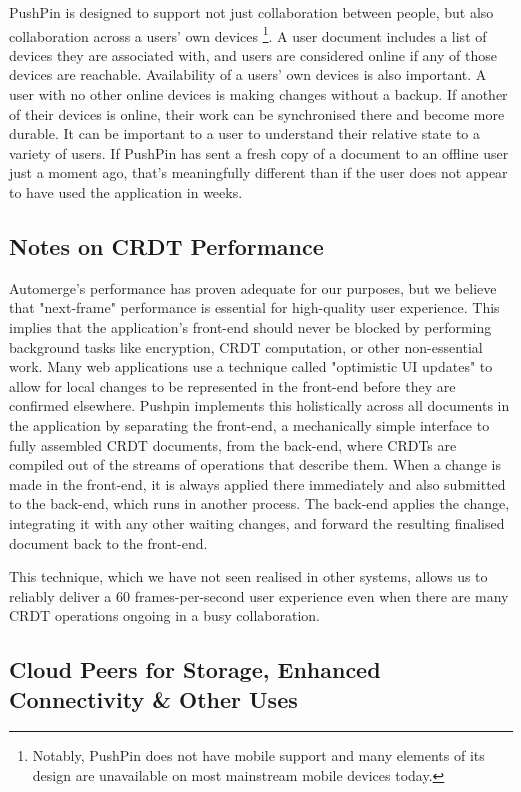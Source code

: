 \documentclass[sigplan,10pt]{acmart}
\begin{document}
PushPin is designed to support not just collaboration between people, but also collaboration across a users' own devices \footnote{Notably, PushPin does not have mobile support and many elements of its design are unavailable on most mainstream mobile devices today.}. A user document includes a list of devices they are associated with, and users are considered online if any of those devices are reachable. Availability of a users' own devices is also important. A user with no other online devices is making changes without a backup. If another of their devices is online, their work can be synchronised there and become more durable. It can be important to a user to understand their relative state to a variety of users. If PushPin has sent a fresh copy of a document to an offline user just a moment ago, that's meaningfully different than if the user does not appear to have used the application in weeks. 

\subsection{Notes on CRDT Performance}

Automerge's performance has proven adequate for our purposes, but we believe that "next-frame" performance is essential for high-quality user experience. This implies that the application's front-end should never be blocked by performing background tasks like encryption, CRDT computation, or other non-essential work. Many web applications use a technique called "optimistic UI updates" to allow for local changes to be represented in the front-end before they are confirmed elsewhere. Pushpin implements this holistically across all documents in the application by separating the front-end, a mechanically simple interface to fully assembled CRDT documents, from the back-end, where CRDTs are compiled out of the streams of operations that describe them. When a change is made in the front-end, it is always applied there immediately and also submitted to the back-end, which runs in another process. The back-end applies the change, integrating it with any other waiting changes, and forward the resulting finalised document back to the front-end.

This technique, which we have not seen realised in other systems, allows us to reliably deliver a 60 frames-per-second user experience even when there are many CRDT operations ongoing in a busy collaboration.

\subsection{Cloud Peers for Storage, Enhanced Connectivity & Other Uses}
\end{document}
